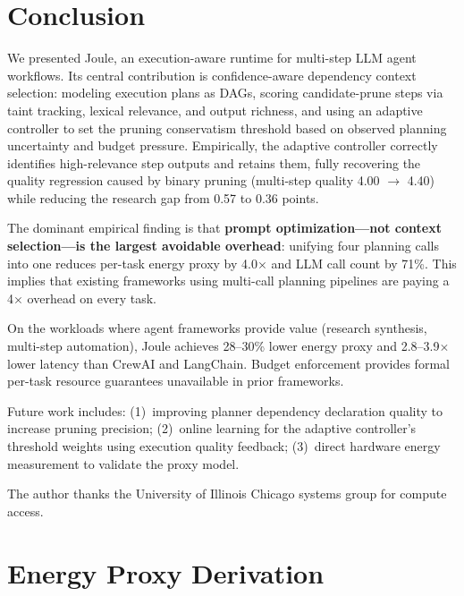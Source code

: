 \documentclass[sigconf,authordraft]{acmart}
\begin{document}
\section{Conclusion}
\label{sec:conclusion}

We presented Joule, an execution-aware runtime for multi-step LLM agent workflows.
Its central contribution is confidence-aware dependency context selection: modeling execution plans as DAGs, scoring candidate-prune steps via taint tracking, lexical relevance, and output richness, and using an adaptive controller to set the pruning conservatism threshold based on observed planning uncertainty and budget pressure.
Empirically, the adaptive controller correctly identifies high-relevance step outputs and retains them, fully recovering the quality regression caused by binary pruning (multi-step quality 4.00 $\to$ 4.40) while reducing the research gap from 0.57 to 0.36 points.

The dominant empirical finding is that \textbf{prompt optimization---not context selection---is the largest avoidable overhead}: unifying four planning calls into one reduces per-task energy proxy by 4.0$\times$ and LLM call count by 71\%.
This implies that existing frameworks using multi-call planning pipelines are paying a 4$\times$ overhead on every task.

On the workloads where agent frameworks provide value (research synthesis, multi-step automation), Joule achieves 28--30\% lower energy proxy and 2.8--3.9$\times$ lower latency than CrewAI and LangChain.
Budget enforcement provides formal per-task resource guarantees unavailable in prior frameworks.

Future work includes: (1)~improving planner dependency declaration quality to increase pruning precision; (2)~online learning for the adaptive controller's threshold weights using execution quality feedback; (3)~direct hardware energy measurement to validate the proxy model.

\begin{acks}
The author thanks the University of Illinois Chicago systems group for compute access.
\end{acks}




\appendix

\section{Energy Proxy Derivation}
\label{app:energy}
\end{document}
